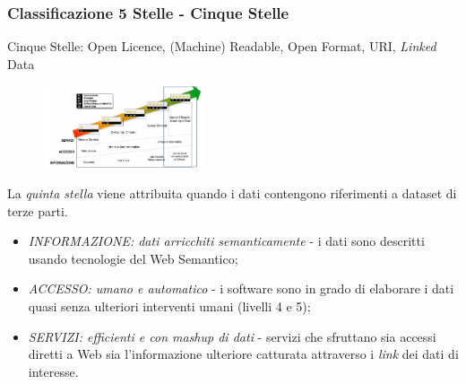 \documentclass[8pt]{beamer}
\begin{document}
\begin{frame}
  \frametitle{Classificazione 5 Stelle - Cinque Stelle}
  
  Cinque Stelle: Open Licence, (Machine) Readable, Open Format, URI, \emph{Linked} Data

  \begin{figure}
     \includegraphics[width=180px]{stella5.png} 
  \end{figure}
  
  La \emph{quinta stella} viene attribuita quando i dati contengono riferimenti a dataset di terze parti.
  \vspace{\baselineskip}

  \begin{itemize}[<+->]
   \item \emph{INFORMAZIONE: dati arricchiti semanticamente} - i dati sono descritti usando tecnologie del Web Semantico;
   \item \emph{ACCESSO: umano e automatico} - i software sono in grado di elaborare i dati quasi senza ulteriori 
   interventi umani (livelli 4 e 5);
   \item \emph{SERVIZI: efficienti e con mashup di dati} - servizi che sfruttano sia accessi diretti a Web 
   sia l'informazione ulteriore catturata attraverso i \emph{link} dei dati di interesse.
  \end{itemize}
\end{frame}
\end{document}
